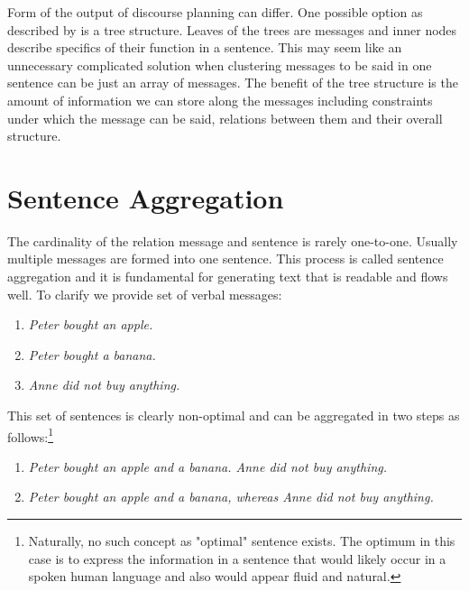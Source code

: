 Form of the output of discourse planning can differ. One possible option as described by \cite{reiter1997building} is a tree structure. Leaves of the trees are messages and inner nodes describe specifics of their function in a sentence. This may seem like an unnecessary complicated solution when clustering messages to be said in one sentence can be just an array of messages. The benefit of the tree structure is the amount of information we can store along the messages including constraints under which the message can be said, relations between them and their overall structure.

\section{Sentence Aggregation}
The cardinality of the relation message and sentence is rarely one-to-one. Usually multiple messages are formed into one sentence. This process is called sentence aggregation and it is fundamental for generating text that is readable and flows well. To clarify we provide set of verbal messages:
\begin{enumerate}
	\item \emph{Peter bought an apple.}\label{sa-one}
	\item \emph{Peter bought a banana.}\label{sa-two}
	\item \emph{Anne did not buy anything.}\label{sa-three}	
\end{enumerate}

This set of sentences is clearly non-optimal and can be aggregated in two steps as follows:\footnote{\label{footnote-opt}Naturally, no such concept as "optimal" sentence exists. The optimum in this case is to express the information in a sentence that would likely occur in a spoken human language and also would appear fluid and natural.}
\begin{enumerate}[resume]
	\item \emph{Peter bought an apple and a banana. Anne did not buy anything.}\label{sa-four}
	\item \emph{Peter bought an apple and a banana, whereas Anne did not buy anything.}\label{sa-five}	
\end{enumerate}

